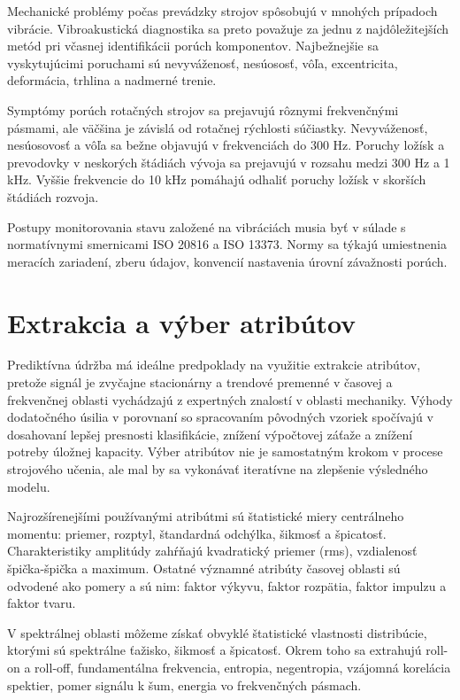 Mechanické problémy počas prevádzky strojov spôsobujú v mnohých prípadoch vibrácie. Vibroakustická diagnostika sa preto považuje za jednu z najdôležitejších metód pri včasnej identifikácii porúch komponentov. Najbežnejšie sa vyskytujúcimi poruchami sú nevyváženosť, nesúososť, vôľa, excentricita, deformácia, trhlina a nadmerné trenie. 

Symptómy porúch rotačných strojov sa prejavujú rôznymi frekvenčnými pásmami, ale väčšina je závislá od rotačnej rýchlosti súčiastky. Nevyváženosť, nesúosovosť a vôľa sa bežne objavujú v frekvenciách do 300 Hz. Poruchy ložísk a prevodovky v neskorých štádiách vývoja sa prejavujú v rozsahu medzi 300 Hz a 1 kHz. Vyššie frekvencie do 10 kHz pomáhajú odhaliť poruchy ložísk v skorších štádiách rozvoja.

Postupy monitorovania stavu založené na vibráciách musia byť v súlade s normatívnymi smernicami ISO 20816 a ISO 13373. Normy sa týkajú umiestnenia meracích zariadení, zberu údajov, konvencií nastavenia úrovní závažnosti porúch. 


\section{Extrakcia a výber atribútov}
Prediktívna údržba má ideálne predpoklady na využitie extrakcie atribútov, pretože signál je zvyčajne stacionárny a trendové premenné v časovej a frekvenčnej oblasti vychádzajú z expertných znalostí v oblasti mechaniky. Výhody dodatočného úsilia v porovnaní so spracovaním pôvodných vzoriek spočívajú v dosahovaní lepšej presnosti klasifikácie, znížení výpočtovej záťaže a znížení potreby úložnej kapacity. Výber atribútov nie je samostatným krokom v procese strojového učenia, ale mal by sa vykonávať iteratívne na zlepšenie výsledného modelu.

Najrozšírenejšími používanými atribútmi sú štatistické miery centrálneho momentu: priemer, rozptyl, štandardná odchýlka, šikmosť a špicatosť. Charakteristiky amplitúdy zahŕňajú kvadratický priemer (rms), vzdialenosť špička-špička a maximum. Ostatné významné atribúty časovej oblasti sú odvodené ako pomery a sú nim: faktor výkyvu, faktor rozpätia, faktor impulzu a faktor tvaru.  

V spektrálnej oblasti môžeme získať obvyklé štatistické vlastnosti distribúcie, ktorými sú spektrálne ťažisko, šikmosť a špicatosť. Okrem toho sa extrahujú roll-on a roll-off, fundamentálna frekvencia, entropia, negentropia, vzájomná korelácia spektier, pomer signálu k šum, energia vo frekvenčných pásmach.

